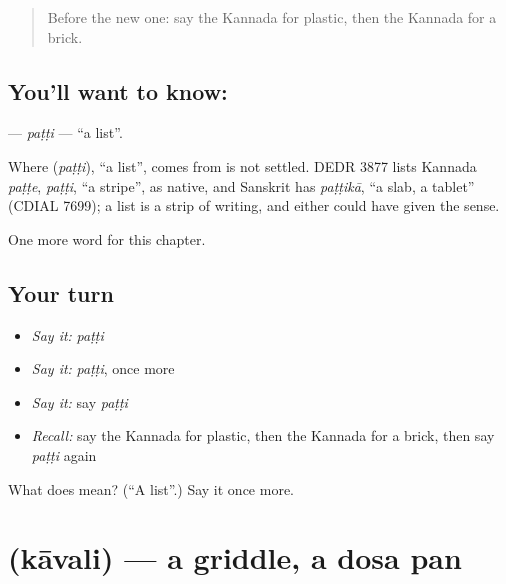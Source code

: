 \label{lesson:KA-C301-patti}



\begin{quote}
Before the new one: say the Kannada for plastic, then the Kannada for a brick.
\end{quote}

\subsection*{You'll want to know: }
\textbf{} — \emph{paṭṭi} — \textquotedblleft{}a list\textquotedblright{}.

\begin{cousinweb}
Where \textbf{} (\emph{paṭṭi}), \textquotedblleft{}a list\textquotedblright{}, comes from is not settled. DEDR 3877 lists Kannada \emph{paṭṭe}, \emph{paṭṭi}, \textquotedblleft{}a stripe\textquotedblright{}, as native, and Sanskrit has \emph{paṭṭikā}, \textquotedblleft{}a slab, a tablet\textquotedblright{} (CDIAL 7699); a list is a strip of writing, and either could have given the sense.
\end{cousinweb}

\begin{grammarlens}[title={What you've built}]
One more word for this chapter.
\end{grammarlens}

\subsection*{Your turn}
\begin{itemize}
\raggedright
  \item \emph{Say it:} \emph{paṭṭi}
  \item \emph{Say it:} \emph{paṭṭi}, once more
  \item \emph{Say it:} say \emph{paṭṭi}
  \item \emph{Recall:} say the Kannada for plastic, then the Kannada for a brick, then say \emph{paṭṭi} again
\end{itemize}

\begin{tcolorbox}[breakable,colback=teal!4,colframe=teal!35!black,title={Before you move on}]
What does  mean? (\textquotedblleft{}A list\textquotedblright{}.) Say it once more.
\end{tcolorbox}
\section[\texorpdfstring{\kn{ಕಾವಲಿ} (kāvali)}{ಕಾವಲಿ (kāvali)}]{ (kāvali) — a griddle, a dosa pan}

